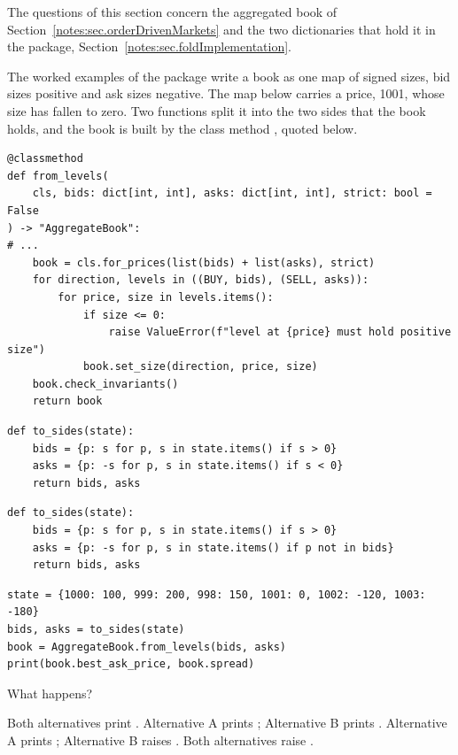 The questions of this section concern the aggregated book of Section~\ref{notes:sec.orderDrivenMarkets}
and the two dictionaries that hold it in the package,
Section~\ref{notes:sec.foldImplementation}.

\begin{question}
\label{question.signedStateToSides}
The worked examples of the package write a book as one map of signed sizes,
bid sizes positive and ask sizes negative.
The map below carries a price, 1001, whose size has fallen to zero.
Two functions split it into the two sides that the book holds,
and the book is built by the class method , quoted below.
\begin{lstlisting}[caption={\protect\codehl{unito26.lob.orderbook.AggregateBook.from\_levels}, abridged.}, label=listing.signedStateFromLevels]
@classmethod
def from_levels(
    cls, bids: dict[int, int], asks: dict[int, int], strict: bool = False
) -> "AggregateBook":
# ...
    book = cls.for_prices(list(bids) + list(asks), strict)
    for direction, levels in ((BUY, bids), (SELL, asks)):
        for price, size in levels.items():
            if size <= 0:
                raise ValueError(f"level at {price} must hold positive size")
            book.set_size(direction, price, size)
    book.check_invariants()
    return book
\end{lstlisting}
\begin{lstlisting}[caption={Alternative A}, label=listing.signedStateSidesA]
def to_sides(state):
    bids = {p: s for p, s in state.items() if s > 0}
    asks = {p: -s for p, s in state.items() if s < 0}
    return bids, asks
\end{lstlisting}
\begin{lstlisting}[caption={Alternative B}, label=listing.signedStateSidesB]
def to_sides(state):
    bids = {p: s for p, s in state.items() if s > 0}
    asks = {p: -s for p, s in state.items() if p not in bids}
    return bids, asks
\end{lstlisting}
\begin{lstlisting}[caption={Run once with each alternative}, label=listing.signedStateRun]
state = {1000: 100, 999: 200, 998: 150, 1001: 0, 1002: -120, 1003: -180}
bids, asks = to_sides(state)
book = AggregateBook.from_levels(bids, asks)
print(book.best_ask_price, book.spread)
\end{lstlisting}
What happens?
\begin{choices}
 \choice Both alternatives print .
 \choice Alternative A prints ; Alternative B prints .
 \correctchoice Alternative A prints ; Alternative B raises .
 \choice Both alternatives raise .
\end{choices}
\end{question}

